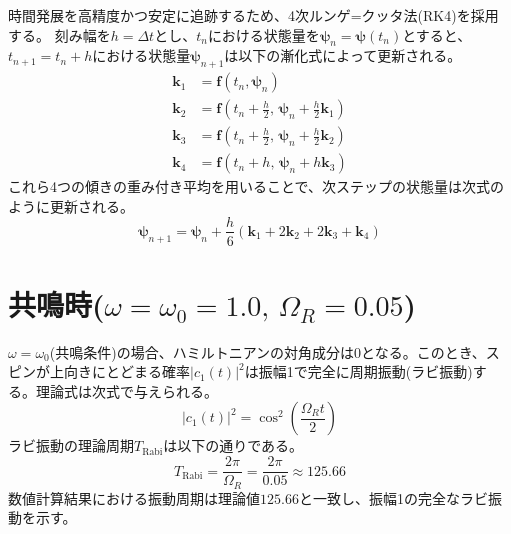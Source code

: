 \documentclass[11pt,a4paper,uplatex]{jsarticle}
\begin{document}
時間発展を高精度かつ安定に追跡するため、4次ルンゲ=クッタ法(RK4)を採用する。
刻み幅を$h = \Delta t$とし、$t_n$における状態量を$\boldsymbol{\psi}_n = \boldsymbol{\psi}(t_n)$とすると、$t_{n+1} = t_n + h$における状態量$\boldsymbol{\psi}_{n+1}$は以下の漸化式によって更新される。
\begin{align}
    \boldsymbol{k}_1 &= \boldsymbol{f}(t_n, \boldsymbol{\psi}_n) \\[4pt]
    \boldsymbol{k}_2 &= \boldsymbol{f}\left(t_n + \frac{h}{2}, \, \boldsymbol{\psi}_n + \frac{h}{2} \boldsymbol{k}_1\right) \\[4pt]
    \boldsymbol{k}_3 &= \boldsymbol{f}\left(t_n + \frac{h}{2}, \, \boldsymbol{\psi}_n + \frac{h}{2} \boldsymbol{k}_2\right) \\[4pt]
    \boldsymbol{k}_4 &= \boldsymbol{f}\left(t_n + h, \, \boldsymbol{\psi}_n + h \boldsymbol{k}_3\right)
\end{align}
これら4つの傾きの重み付き平均を用いることで、次ステップの状態量は次式のように更新される。
\begin{equation}
    \boldsymbol{\psi}_{n+1} = \boldsymbol{\psi}_n + \frac{h}{6} \left(\boldsymbol{k}_1 + 2\boldsymbol{k}_2 + 2\boldsymbol{k}_3 + \boldsymbol{k}_4 \right)
\end{equation}

\section{共鳴時($\omega = \omega_0 = 1.0, \, \Omega_R = 0.05$)}
$\omega = \omega_0$(共鳴条件)の場合、ハミルトニアンの対角成分は0となる。このとき、スピンが上向きにとどまる確率$|c_1(t)|^2$は振幅1で完全に周期振動(ラビ振動)する。理論式は次式で与えられる。
\begin{equation}
    |c_1(t)|^2 = \cos^2\left(\frac{\Omega_R t}{2}\right)
\end{equation}
ラビ振動の理論周期$T_{\text{Rabi}}$は以下の通りである。
\begin{equation}
    T_{\text{Rabi}} = \frac{2\pi}{\Omega_R} = \frac{2\pi}{0.05} \approx 125.66
\end{equation}
数値計算結果における振動周期は理論値$125.66$と一致し、振幅1の完全なラビ振動を示す。
\end{document}

